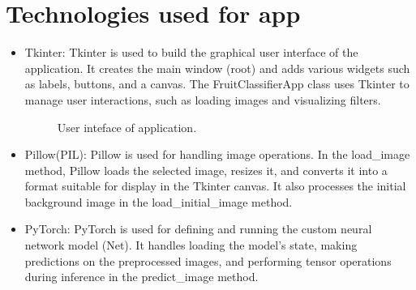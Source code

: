 \documentclass[a4paper,oneside,11pt]{book}
\begin{document}
\section{Technologies used for app}
\begin{itemize}
    \item Tkinter: Tkinter is used to build the graphical user interface of the application. It creates the main window (root) and adds various widgets such as labels, buttons, and a canvas. The FruitClassifierApp class uses Tkinter to manage user interactions, such as loading images and visualizing filters.
    \begin{figure}[H]
        \centering
        \caption{User inteface of application.}
    \end{figure}
    \item Pillow(PIL): Pillow is used for handling image operations. In the load\_image method, Pillow loads the selected image, resizes it, and converts it into a format suitable for display in the Tkinter canvas. It also processes the initial background image in the load\_initial\_image method.
    \item PyTorch: PyTorch is used for defining and running the custom neural network model (Net). It handles loading the model's state, making predictions on the preprocessed images, and performing tensor operations during inference in the predict\_image method.

\end{itemize}
\end{document}

